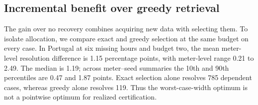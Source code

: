 \documentclass[12pt]{article}
\begin{document}
\subsection{Incremental benefit over greedy retrieval}\label{app:greedy-detail}
The gain over no recovery combines acquiring new data with selecting them.
To isolate allocation, we compare exact and greedy selection at the same
budget on every case. In Portugal at six missing hours and budget two,
the mean meter-level resolution difference is 1.15 percentage
points, with meter-level range 0.21 to 2.49.
The median is 1.19; across meter--seed summaries
the 10th and 90th percentiles are 0.47 and 1.87 points.
Exact selection alone resolves 785 dependent cases,
whereas greedy alone resolves 119. Thus the worst-case-width
optimum is not a pointwise optimum for realized certification.
\end{document}
